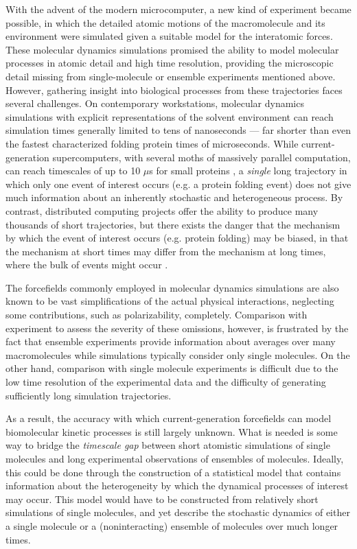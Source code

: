 With the advent of the modern microcomputer, a new kind of experiment became possible, in which the detailed atomic motions of the macromolecule and its environment were simulated given a suitable model for the interatomic forces.
These molecular dynamics simulations promised the ability to model molecular processes in atomic detail and high time resolution, providing the microscopic detail missing from single-molecule or ensemble experiments mentioned above.
However, gathering insight into biological processes from these trajectories faces several challenges.
On contemporary workstations, molecular dynamics simulations with explicit representations of the solvent environment can reach simulation times generally limited to tens of nanoseconds --- far shorter than even the fastest characterized folding protein times of microseconds. 
While current-generation supercomputers, with several moths of massively parallel computation, can reach timescales of up to 10 $\mu$s for small proteins \cite{germain:2005a}, a \emph{single} long trajectory in which only one event of interest occurs (e.g. a protein folding event) does not give much information about an inherently stochastic and heterogeneous process.
By contrast, distributed computing projects \cite{pande:2000a,pande:2002a} offer the ability to produce many thousands of short trajectories, but there exists the danger that the mechanism by which the event of interest occurs (e.g. protein folding) may be biased, in that the mechanism at short times may differ from the mechanism at long times, where the bulk of events might occur \cite{fersht:2002a,marianayagam:2005a}.

The forcefields commonly employed in molecular dynamics simulations are also known to be vast simplifications of the actual physical interactions, neglecting some contributions, such as polarizability, completely.
Comparison with experiment to assess the severity of these omissions, however, is frustrated by the fact that ensemble experiments provide information about averages over many macromolecules while simulations typically consider only single molecules. %
On the other hand, comparison with single molecule experiments is difficult due to the low time resolution of the experimental data and the difficulty of generating sufficiently long simulation trajectories.

As a result, the accuracy with which current-generation forcefields can model biomolecular kinetic processes is still largely unknown.
What is needed is some way to bridge the \emph{timescale gap} between short atomistic simulations of single molecules and long experimental observations of ensembles of molecules.
Ideally, this could be done through the construction of a statistical model that contains information about the heterogeneity by which the dynamical processes of interest may occur.
This model would have to be constructed from relatively short simulations of single molecules, and yet describe the stochastic dynamics of either a single molecule or a (noninteracting) ensemble of molecules over much longer times.

